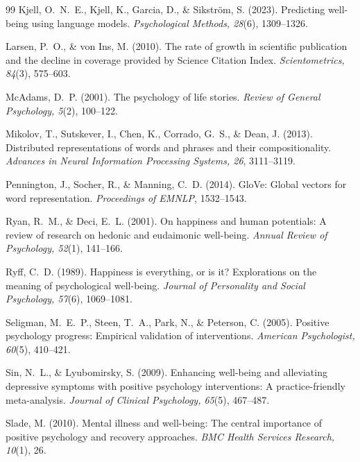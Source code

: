 \documentclass[12pt,a4paper]{article}
\begin{document}
\begin{thebibliography}{99}
Kjell, O.~N.~E., Kjell, K., Garcia, D., \& Sikstr{\"o}m, S. (2023).
Predicting well-being using language models.
\textit{Psychological Methods, 28}(6), 1309--1326.

Larsen, P.~O., \& von Ins, M. (2010).
The rate of growth in scientific publication and the decline in coverage provided by Science Citation Index.
\textit{Scientometrics, 84}(3), 575--603.

McAdams, D.~P. (2001).
The psychology of life stories.
\textit{Review of General Psychology, 5}(2), 100--122.

Mikolov, T., Sutskever, I., Chen, K., Corrado, G.~S., \& Dean, J. (2013).
Distributed representations of words and phrases and their compositionality.
\textit{Advances in Neural Information Processing Systems, 26}, 3111--3119.

Pennington, J., Socher, R., \& Manning, C.~D. (2014).
GloVe: Global vectors for word representation.
\textit{Proceedings of EMNLP}, 1532--1543.

Ryan, R.~M., \& Deci, E.~L. (2001).
On happiness and human potentials: A review of research on hedonic and eudaimonic well-being.
\textit{Annual Review of Psychology, 52}(1), 141--166.

Ryff, C.~D. (1989).
Happiness is everything, or is it? Explorations on the meaning of psychological well-being.
\textit{Journal of Personality and Social Psychology, 57}(6), 1069--1081.

Seligman, M.~E.~P., Steen, T.~A., Park, N., \& Peterson, C. (2005).
Positive psychology progress: Empirical validation of interventions.
\textit{American Psychologist, 60}(5), 410--421.

Sin, N.~L., \& Lyubomirsky, S. (2009).
Enhancing well-being and alleviating depressive symptoms with positive psychology interventions: A practice-friendly meta-analysis.
\textit{Journal of Clinical Psychology, 65}(5), 467--487.

Slade, M. (2010).
Mental illness and well-being: The central importance of positive psychology and recovery approaches.
\textit{BMC Health Services Research, 10}(1), 26.


\end{thebibliography}
\end{document}
